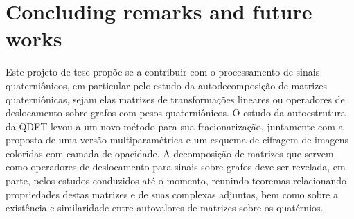 \chapter{Concluding remarks and future works}
\label{ch:conclusion}

Este projeto de tese prop\~oe-se a contribuir com o processamento de sinais quaterni\^onicos, em particular pelo estudo da autodecomposi\c c\~ao de matrizes quaterni\^onicas, sejam elas matrizes de transforma\c c\~oes lineares ou operadores de deslocamento sobre grafos com pesos quaterni\^onicos. O estudo da autoestrutura da QDFT levou a um novo m\'etodo para sua fracionariza\c c\~ao, juntamente com a proposta de uma vers\~ao multiparam\'etrica e um esquema de cifragem de imagens coloridas com camada de opacidade. A decomposi\c c\~ao de matrizes que servem como operadores de deslocamento para sinais sobre grafos deve ser revelada, em parte, pelos estudos conduzidos at\'e o momento, reunindo teoremas relacionando propriedades destas matrizes e de suas complexas adjuntas, bem como sobre a exist\^encia e similaridade entre autovalores de matrizes sobre os quat\'ernios.

